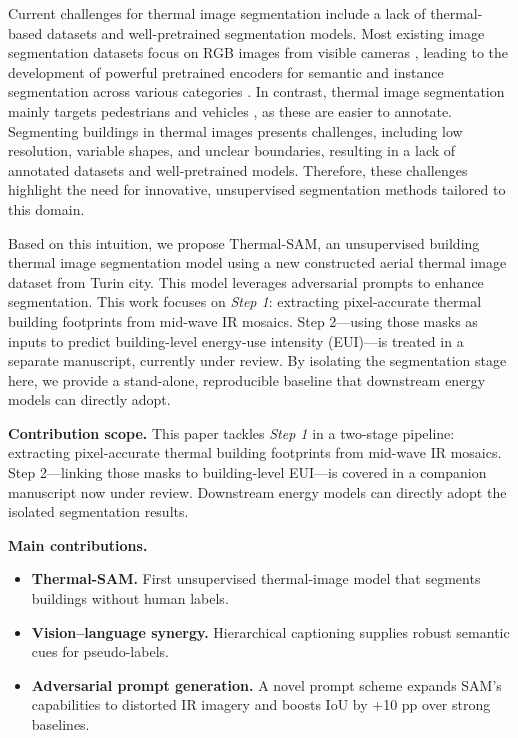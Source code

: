 \documentclass{article}
\theoremstyle{plain}
\theoremstyle{definition}
\theoremstyle{remark}
\begin{document}
Current challenges for thermal image segmentation include a lack of thermal-based datasets and well-pretrained segmentation models. Most existing image segmentation datasets focus on RGB images from visible cameras \cite{zhou2017scene,lin2014microsoft}, leading to the development of powerful pretrained encoders for semantic and instance segmentation across various categories \cite{strudel2021segmenter,kirillov2023segment}. In contrast, thermal image segmentation mainly targets pedestrians \cite{wang2019thermal,altay2022use} and vehicles \cite{yang2015new,masouleh2019development}, as these are easier to annotate. Segmenting buildings in thermal images presents challenges, including low resolution, variable shapes, and unclear boundaries, resulting in a lack of annotated datasets and well-pretrained models.  Therefore, these challenges highlight the need for innovative, unsupervised segmentation methods tailored to this domain.

Based on this intuition, we propose Thermal-SAM, an unsupervised building thermal image segmentation model using a new constructed aerial thermal image dataset from Turin city. This model leverages adversarial prompts to enhance segmentation. This work focuses on \emph{Step 1}: extracting pixel-accurate thermal building footprints from mid-wave IR mosaics. Step 2—using those masks as inputs to predict building-level energy-use intensity (EUI)—is treated in a separate manuscript, currently under review. By isolating the segmentation stage here, we provide a stand-alone, reproducible baseline that downstream energy models can directly adopt.


\textbf{Contribution scope.}
This paper tackles \emph{Step 1} in a two-stage pipeline: extracting pixel-accurate thermal building footprints from mid-wave IR mosaics. Step 2—linking those masks to building-level EUI—is covered in a companion manuscript now under review. Downstream energy models can directly adopt the isolated segmentation results.

\textbf{Main contributions.}
\begin{itemize}
    \item \textbf{Thermal-SAM.} First unsupervised thermal-image model that segments buildings without human labels.
    \item \textbf{Vision–language synergy.} Hierarchical captioning supplies robust semantic cues for pseudo-labels.
    \item \textbf{Adversarial prompt generation.} A novel prompt scheme expands SAM’s capabilities to distorted IR imagery and boosts IoU by +10 pp over strong baselines.
\end{itemize}
\end{document}
